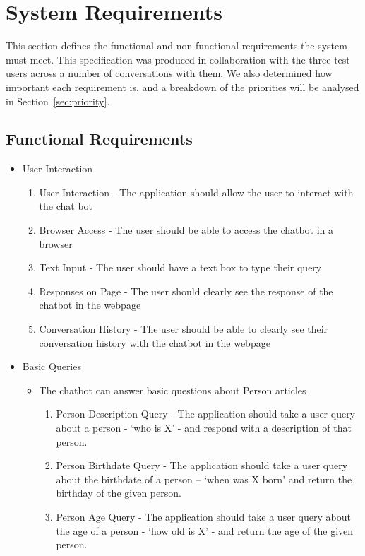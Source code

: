 \section{System Requirements}
\label{sec:requirements}
This section defines the functional and non-functional requirements the system must meet. This specification was produced in collaboration with the three test users across a number of conversations with them. We also determined how important each requirement is, and a breakdown of the priorities will be analysed in Section~\ref{sec:priority}.

\subsection{Functional Requirements}

\begin{itemize}
	\item User Interaction
	\begin{enumerate}[label*=F\arabic*.]
		\item User Interaction - The application should allow the user to interact with the chat bot
		\item Browser Access - The user should be able to access the chatbot in a browser
		\item Text Input - The user should have a text box to type their query
		\item Responses on Page - The user should clearly see the response of the chatbot in the webpage
		\item Conversation History - The user should be able to clearly see their conversation history with the chatbot in the webpage
	\end{enumerate}
	\item Basic Queries
	\begin{itemize}
		\item The chatbot can answer basic questions about Person articles
		\begin{enumerate}[resume*]
			\item Person Description Query - The application should take a user query about a person - ‘who is X’ - and respond with a description of that person.
			\item Person Birthdate Query - The application should take a user query about the birthdate of a person – ‘when was X born’ and return the birthday of the given person.
			\item Person Age Query - The application should take a user query about the age of a person - ‘how old is X’ - and return the age of the given person.

\end{enumerate}
\end{itemize}
\end{itemize}
